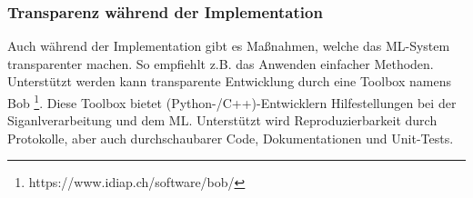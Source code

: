 

\subsubsection{Transparenz während der Implementation}
Auch während der Implementation gibt es Maßnahmen, welche das ML-System transparenter machen. So empfiehlt z.B. \cite{huvc2021anomaly} das Anwenden einfacher Methoden.
Unterstützt werden kann transparente Entwicklung durch eine Toolbox namens Bob \footnote{https://www.idiap.ch/software/bob/}. Diese Toolbox bietet (Python-/C++)-Entwicklern Hilfestellungen bei der Siganlverarbeitung und dem ML. Unterstützt wird Reproduzierbarkeit durch Protokolle, aber auch durchschaubarer Code, Dokumentationen und Unit-Tests. 

